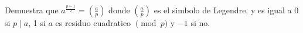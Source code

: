 \begin{problem}
    Demuestra que $a^{\frac{p-1}{2}}=\left( \frac{a}{p} \right)$
    donde $\left( \frac{a}{p} \right)$ es el simbolo de Legendre, y es igual a 0
    si $p \mid a$, 1 si $a$ es residuo cuadratico $\pmod p$ y $-1$ si no.
    \label{25EN2_4_2}
\end{problem}